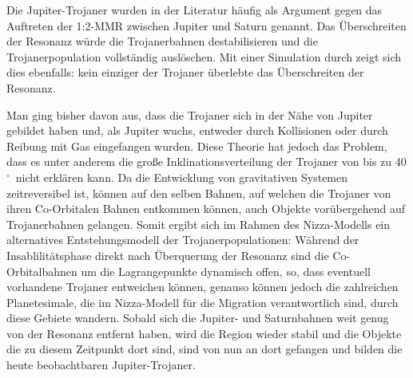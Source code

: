 \documentclass[12pt,a4paper,twoside]{article}
\renewcommand{\cite}{\citep}
\newcommand{\degree}{$^\circ$}
\begin{document}
Die Jupiter-Trojaner wurden in der Literatur häufig als Argument gegen das Auftreten der 1:2-MMR zwischen Jupiter und Saturn genannt. Das Überschreiten der Resonanz würde die Trojanerbahnen destabilisieren und die Trojanerpopulation vollständig auslöschen\cite{Gomes1998,Michtchenko2001,Morbidelli2005}.
Mit einer Simulation durch \cite{Morbidelli2005} zeigt sich dies ebenfalls: kein einziger der Trojaner überlebte das Überschreiten der Resonanz.

Man ging bisher davon aus, dass die Trojaner sich in der Nähe von Jupiter gebildet haben und, als Jupiter wuchs, entweder durch Kollisionen oder durch Reibung mit Gas eingefangen wurden\cite{Yoder1979Icar,Shoemaker1989aste,Peale1993Icar,Kary1995Icar,Marzari1998Icar,Fleming2000Icar,Kortenkamp2001DPS,Morbidelli2005}. 
Diese Theorie hat jedoch das Problem, dass es unter anderem die große Inklinationsverteilung der Trojaner von bis zu 40\degree\ nicht erklären kann\cite{Marzari2002,Morbidelli2005}.
Da die Entwicklung von gravitativen Systemen zeitreversibel ist, können auf den selben Bahnen,
auf welchen die Trojaner von ihren Co-Orbitalen Bahnen entkommen können, auch Objekte vorübergehend auf Trojanerbahnen gelangen.
Somit ergibt sich im Rahmen des Nizza-Modells ein alternatives Entstehungsmodell der Trojanerpopulationen: Während der Insablilitätsphase direkt nach Überquerung der Resonanz sind die Co-Orbitalbahnen um die Lagrangepunkte dynamisch offen, so, dass eventuell vorhandene Trojaner entweichen können, genauso können jedoch die zahlreichen Planetesimale, die im Nizza-Modell für die Migration verantwortlich sind, durch diese Gebiete wandern.
Sobald sich die Jupiter- und Saturnbahnen weit genug von der Resonanz entfernt haben, wird die Region wieder stabil und die Objekte die zu diesem Zeitpunkt dort sind, sind von nun an dort gefangen und bilden die heute beobachtbaren Jupiter-Trojaner.
\end{document}
